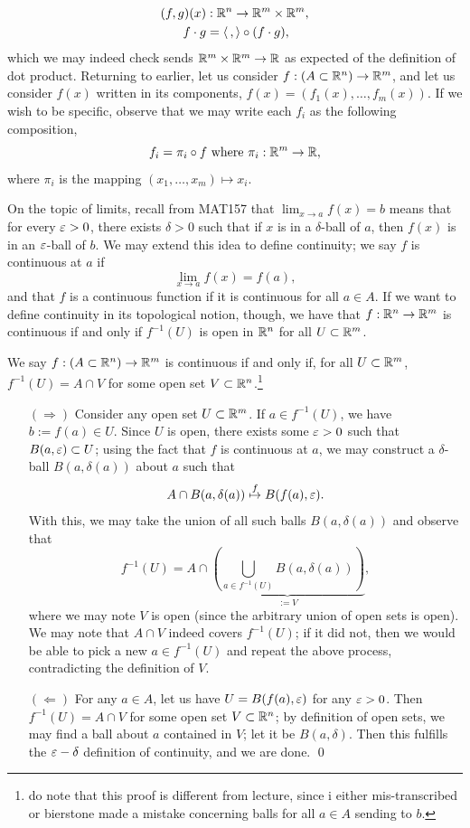 \begin{align*}
    (f, g)(x) &: \mathbb R^n \to \mathbb R^m \times \mathbb R^m, \\
    f \cdot g &= \left< \, , \right> \circ (f \cdot g), 
\end{align*}
which we may indeed check sends $\mathbb R^m \times \mathbb R^m \to \mathbb R$ as expected of the definition of dot product.
\medskip\newline
\noindent Returning to earlier, let us consider $f : (A \subset \mathbb R^n) \to \mathbb R^m$, and let us consider $f(x)$ written in its components, $f(x) = (f_1(x), \dots, f_m(x))$. If we wish to be specific, observe that we may write each $f_i$ as the following composition,
\[ f_i = \pi_i \circ f \text{ where } \pi_i : \mathbb R^m \to \mathbb R, \]
where $\pi_i$ is the mapping $(x_1, \dots, x_m) \mapsto x_i$.

\newpage
\noindent On the topic of limits, recall from MAT157 that $\lim_{x \to a} f(x) = b$ means that for every $\varepsilon > 0$, there exists $\delta > 0$ such that if $x$ is in a $\delta$-ball of $a$, then $f(x)$ is in an $\varepsilon$-ball of $b$. We may extend this idea to define continuity; we say $f$ is continuous at $a$ if
\[ \lim_{x \to a} f(x) = f(a), \]
and that $f$ is a continuous function if it is continuous for all $a \in A$. If we want to define continuity in its topological notion, though, we have that $f : \mathbb R^n \to \mathbb R^m$ is continuous if and only if $f^{-1}(U)$ is open in $\mathbb R^n$ for all $U \subset \mathbb R^m$.
\begin{simplethm}[Spivak 1.8]
    We say $f : (A \subset \mathbb R^n) \to \mathbb R^m$ is continuous if and only if, for all $U \subset \mathbb R^m$, $f^{-1}(U) = A \cap V$ for some open set $V \subset \mathbb R^n$.\footnote{do note that this proof is different from lecture, since i either mis-transcribed or bierstone made a mistake concerning balls for all $a \in A$ sending to $b$. }
\end{simplethm}
\begin{itemize}
    \item[$(\Rightarrow)$] Consider any open set $U \subset \mathbb R^m$. If $a \in f^{-1}(U)$, we have $b := f(a) \in U$. Since $U$ is open, there exists some $\varepsilon > 0$ such that $B(a, \varepsilon) \subset U$; using the fact that $f$ is continuous at $a$, we may construct a $\delta$-ball $B(a, \delta(a))$ about $a$ such that
    \[ A \cap B(a, \delta(a)) \stackrel{f}{\mapsto} B(f(a), \varepsilon). \]
    With this, we may take the union of all such balls $B(a, \delta(a))$ and observe that
    \[ f^{-1}(U) = A \cap \underbrace{\left(\bigcup_{a \in f^{-1}(U)} B(a, \delta(a))\right)}_{:= V}, \]
    where we may note $V$ is open (since the arbitrary union of open sets is open). We may note that $A \cap V$ indeed covers $f^{-1}(U)$; if it did not, then we would be able to pick a new $a \in f^{-1}(U)$ and repeat the above process, contradicting the definition of $V$.

    \item[$(\Leftarrow)$] For any $a \in A$, let us have $U = B(f(a), \varepsilon)$ for any $\varepsilon > 0$. Then $f^{-1}(U) = A \cap V$ for some open set $V \subset \mathbb R^n$; by definition of open sets, we may find a ball about $a$ contained in $V$; let it be $B(a, \delta)$. Then this fulfills the $\varepsilon-\delta$ definition of continuity, and we are done. \qed 
\end{itemize}